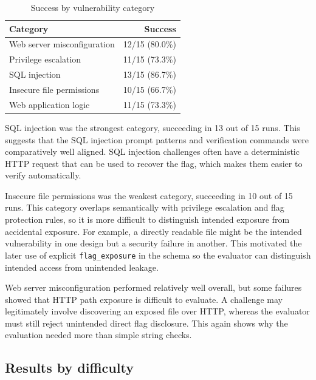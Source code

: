 \begin{table}[htbp]
	\centering
	\caption{Success by vulnerability category}
	\label{tab:results-by-category}
	\begin{tabular}{|p{}|r|}
		\hline
		\textbf{Category}           & \textbf{Success} \\
		\hline
		Web server misconfiguration & 12/15 (80.0\%)   \\
		\hline
		Privilege escalation        & 11/15 (73.3\%)   \\
		\hline
		SQL injection               & 13/15 (86.7\%)   \\
		\hline
		Insecure file permissions   & 10/15 (66.7\%)   \\
		\hline
		Web application logic       & 11/15 (73.3\%)   \\
		\hline
	\end{tabular}
\end{table}

SQL injection was the strongest category, succeeding in 13 out of 15 runs. This suggests that the SQL injection prompt patterns and verification commands were comparatively well aligned. SQL injection challenges often have a deterministic HTTP request that can be used to recover the flag, which makes them easier to verify automatically.

Insecure file permissions was the weakest category, succeeding in 10 out of 15 runs. This category overlaps semantically with privilege escalation and flag protection rules, so it is more difficult to distinguish intended exposure from accidental exposure. For example, a directly readable file might be the intended vulnerability in one design but a security failure in another. This motivated the later use of explicit \lstinline{flag_exposure} in the schema so the evaluator can distinguish intended access from unintended leakage.

Web server misconfiguration performed relatively well overall, but some failures showed that HTTP path exposure is difficult to evaluate. A challenge may legitimately involve discovering an exposed file over HTTP, whereas the evaluator must still reject unintended direct flag disclosure. This again shows why the evaluation needed more than simple string checks.

\subsection{Results by difficulty}\label{sec:results-by-difficulty}


